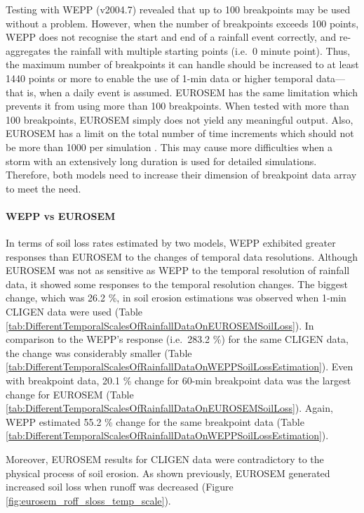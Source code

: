 Testing with WEPP (v2004.7) revealed that up to 100 breakpoints may be used
without a problem. However, when the number of breakpoints exceeds 100
points, WEPP does not recognise the start and end of a rainfall event correctly,
and re-aggregates the rainfall with multiple starting points (i.e.\ 0 minute
point). Thus, the maximum number of breakpoints it can handle should be
increased to at least 1440 points or more to enable the use of 1-min data or
higher temporal data---that is, when a daily event is assumed. EUROSEM has the
same limitation which prevents it from using more than 100 breakpoints. When
tested with more than 100 breakpoints, EUROSEM simply does not yield any
meaningful output. Also, EUROSEM has a limit on the total number of time
increments which should not be more than 1000 per simulation
\citep{morgan1998-europeansoilerosion}. This may cause more difficulties when a
storm with an extensively long duration is used for detailed simulations.
Therefore, both models need to increase their dimension of breakpoint data array
to meet the need.

\paragraph{WEPP vs EUROSEM} In terms of soil loss rates estimated by two models,
WEPP exhibited greater responses than EUROSEM to the changes of temporal
data resolutions. Although EUROSEM was not as sensitive as WEPP to the temporal
resolution of rainfall data, it showed some responses to the temporal resolution
changes.
The biggest change, which was 26.2 \%, in soil erosion estimations was observed
when 1-min CLIGEN data were used (Table
\ref{tab:DifferentTemporalScalesOfRainfallDataOnEUROSEMSoilLoss}).
In comparison to the WEPP's response (i.e.\ 283.2 \%) for the same CLIGEN data,
the change was considerably smaller (Table
\ref{tab:DifferentTemporalScalesOfRainfallDataOnWEPPSoilLossEstimation}). Even
with breakpoint data, 20.1 \% change for 60-min breakpoint data was the largest
change for EUROSEM (Table
\ref{tab:DifferentTemporalScalesOfRainfallDataOnEUROSEMSoilLoss}). Again, WEPP
estimated 55.2 \% change for the same breakpoint data (Table
\ref{tab:DifferentTemporalScalesOfRainfallDataOnWEPPSoilLossEstimation}).

Moreover, EUROSEM results for CLIGEN data were contradictory to the physical
process of soil erosion. As shown previously, EUROSEM generated increased soil
loss when runoff was decreased (Figure \ref{fig:eurosem_roff_sloss_temp_scale}).

